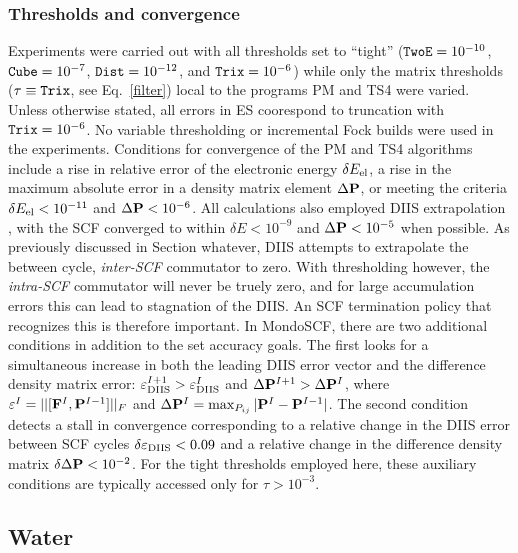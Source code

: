 \commentoutA{\documentclass[prb,aps,twocolumn,twocolumngrid,secnumarabic,superbib,hyperref]{revtex4}}
\begin{document}
\subsubsection{Thresholds and convergence}
Experiments were carried out with all thresholds set to ``tight''
(${\tt TwoE}=10^{-10}$,  ${\tt Cube}=10^{-7}$, ${\tt Dist}=10^{-12}$, 
and ${\tt Trix}=10^{-6}$) while only the matrix thresholds ($\tau \equiv {\tt Trix}$, 
see Eq.~\ref{filter}) local to the programs {\sc PM} and {\sc TS4} were varied.
Unless otherwise stated, all errors in ES coorespond to  truncation with ${\tt Trix}=10^{-6}$.
No variable thresholding or incremental Fock builds were used in the experiments. 
Conditions for convergence of the PM and TS4 algorithms include a rise in relative 
error of the electronic energy $\delta E_{\rm el}$, a rise in the maximum absolute 
error in a density matrix element $\Delta{\bf P}$, or meeting the criteria 
$\delta E_{\rm el} < 10^{-11}$ and $\Delta{\bf P} < 10^{-6}$.  
All calculations also employed DIIS extrapolation \cite{PPulay88}, with the SCF
converged to within $\delta E < 10^{-9}$ and $\Delta{\bf P} < 10^{-5}$ when possible.
As previously discussed in Section whatever, DIIS attempts to extrapolate the between
cycle, {\em inter-SCF} 
commutator to zero.  With thresholding however, the {\em intra-SCF} commutator 
will never be truely zero, and for large accumulation errors this can lead to 
stagnation of the DIIS.  An SCF termination policy that recognizes this is 
therefore important.  In {\sc MondoSCF}, there are two additional conditions 
in addition to the set accuracy goals.  The first looks for a simultaneous increase 
in both the leading DIIS error vector and the difference density matrix error:
$\varepsilon^{I+1}_{\rm DIIS}>\varepsilon^{I}_{\rm DIIS}$ and 
$\Delta {\bf P}^{I+1}> \Delta {\bf P}^{I}$, where 
$\varepsilon^{I}=||[{\bf F}^{I},{\bf P}^{I-1}]||_F$ and 
$\Delta {\bf P}^{I}=\max_{P_{ij}}|{\bf P}^I-{\bf P}^{I-1}|$.  The second
condition detects a stall in convergence corresponding to a relative change in the 
DIIS error between SCF cycles $\delta { \varepsilon}_{\rm DIIS}<0.09$ and a 
relative change in the difference density matrix $\delta \Delta {\bf P}<10^{-2}$.  
For the tight thresholds employed here, these auxiliary conditions are typically
accessed only for $\tau>10^{-3}$.

\subsection{Water}
\end{document}

